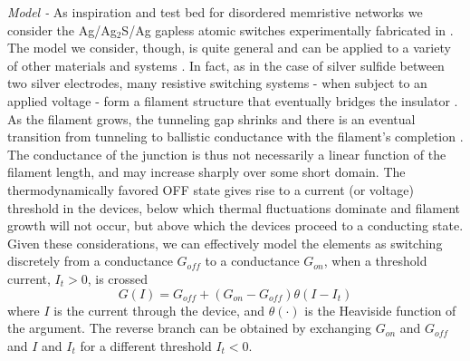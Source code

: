 \documentclass[aps,prl,reprint,groupedaddress]{revtex4-1}
\begin{document}
{\it Model -} As inspiration and test bed for disordered memristive networks we consider
the Ag/Ag$_2$S/Ag gapless atomic switches experimentally fabricated in
\cite{Avizienis2012, Stieg2014, Sillin2014}. The model we consider, though, is quite general and can be applied
to a variety of other materials and systems \cite{Pershin2011}. In fact, as in the case of
silver sulfide between two silver
electrodes, many resistive switching systems - when subject to an applied
voltage - form a filament structure that eventually
bridges the insulator \cite{Xu2010}. As the filament grows, the
tunneling gap shrinks and there is an eventual transition from tunneling
to ballistic conductance with the filament's completion
\cite{Hasegawa2010, Sun2014}. The conductance of the junction is thus not
necessarily a linear function of the filament length, and may increase sharply
over some short domain.
The thermodynamically favored OFF state gives
rise to a current (or voltage) threshold in the devices, below which thermal
fluctuations dominate and filament growth will not occur, but above which the
devices proceed to a conducting state. Given these considerations, we can
effectively model the elements as switching discretely from a conductance $G_{off}$ to a conductance 
$G_{on}$, when a threshold current, $I_t>0$, is crossed
\begin{equation}
G(I) = G_{off} + (G_{on} - G_{off})\theta (I - I_t)
\end{equation}
where $I$ is the current through the device, and $\theta(\cdot)$ is the Heaviside function of the argument. 
The reverse branch can be obtained by exchanging $G_{on}$ and $G_{off}$ and
$I$ and $I_t$ for a different threshold $I_t<0$.
\end{document}
